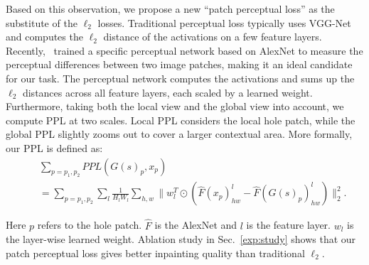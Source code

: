 Based on this observation, we propose a new ``patch perceptual loss'' as the substitute of the $\ell_2$ losses. Traditional perceptual loss typically uses VGG-Net and computes the $\ell_2$ distance of the activations on a few feature layers. Recently,~\cite{zhang2018unreasonable} trained a specific perceptual network based on AlexNet to measure the perceptual differences between two image patches, making it an ideal candidate for our task. The perceptual network computes the activations and sums up the $\ell_2$ distances across all feature layers, each scaled by a learned weight. Furthermore, taking both the local view and the global view into account, we compute PPL at two scales. Local PPL considers the local hole patch, while the global PPL slightly zooms out to cover a larger contextual area. More formally, our PPL is defined as:
\begin{eqnarray}
&& \sum\limits_{p=p_1,p_2}PPL(G(s)_p, x_p) \\ \nonumber
&&= \sum\limits_{p=p_1,p_2}\sum\limits_l\frac{1}{H_lW_l}\sum\limits_{h,w}\parallel w_l^T\odot(\hat{F}(x_p)^l_{hw}-\hat{F}(G(s)_p)^l_{hw})\parallel^2_2.
\end{eqnarray}

Here $p$ refers to the hole patch. $\hat{F}$ is the AlexNet and $l$ is the feature layer. $w_l$ is the layer-wise learned weight. Ablation study in Sec.~\ref{exp:study} shows that our patch perceptual loss gives better inpainting quality than traditional $\ell_2$. 

